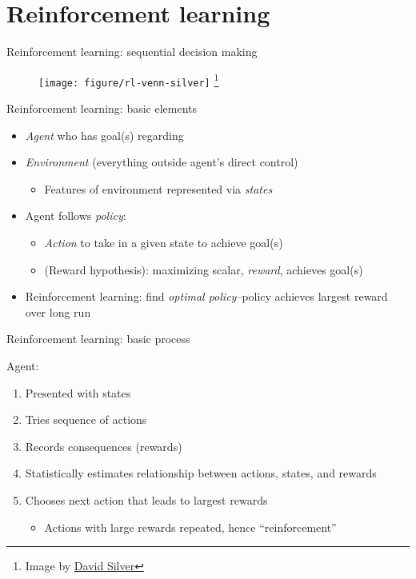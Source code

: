 \documentclass{beamer}
\newcommand\blfootnote[1]{%
  \begingroup
  \renewcommand\thefootnote{}\footnote{#1}%
  \addtocounter{footnote}{-1}%
  \endgroup
}
\begin{document}
\section{Reinforcement learning} %
\label{sec:reinforcement_learning}

\begin{frame}[c]{Reinforcement learning: sequential decision making}
  \begin{figure}
    \centering
    \texttt{[image: figure/rl-venn-silver]}
    \blfootnote{\scriptsize Image by \href{http://www0.cs.ucl.ac.uk/staff/D.Silver/web/Teaching.html}{David Silver}}
  \end{figure}
\end{frame}

\begin{frame}[c]{Reinforcement learning: basic elements}

\begin{itemize}[<+->]
  \item \emph{Agent} who has goal(s) regarding
  \item \emph{Environment} (everything outside agent's direct control)
  \begin{itemize}
    \item Features of environment represented via \emph{states}
  \end{itemize}
  \item Agent follows \emph{policy}: 
  \begin{itemize}
    \item \emph{Action} to take in a given state to achieve goal(s)
    \item (Reward hypothesis): maximizing scalar, \emph{reward}, achieves goal(s) 
  \end{itemize}
  \item Reinforcement learning: find \emph{optimal policy}--policy achieves largest reward over long run 
\end{itemize}

\end{frame}

\begin{frame}[c]{Reinforcement learning: basic process}

Agent:
\begin{enumerate}[<+->]
  \item Presented with states
  \item Tries sequence of actions
  \item Records consequences (rewards)
  \item Statistically estimates relationship between actions, states, and rewards
  \item Chooses next action that leads to largest rewards
  \begin{itemize}
    \item Actions with large rewards repeated, hence ``reinforcement''
  \end{itemize}
\end{enumerate}
\end{frame}
\end{document}
